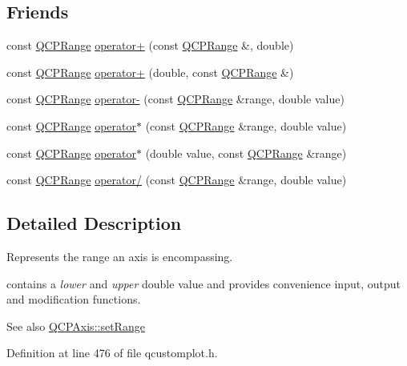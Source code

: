 \subsection*{Friends}
\begin{DoxyCompactItemize}
\item 
const \hyperlink{class_q_c_p_range}{Q\+C\+P\+Range} \hyperlink{class_q_c_p_range_af53ea6fb823a4a5897162b865841de04}{operator+} (const \hyperlink{class_q_c_p_range}{Q\+C\+P\+Range} \&, double)
\item 
const \hyperlink{class_q_c_p_range}{Q\+C\+P\+Range} \hyperlink{class_q_c_p_range_a9fb2e9941d32001482df670c0d704977}{operator+} (double, const \hyperlink{class_q_c_p_range}{Q\+C\+P\+Range} \&)
\item 
const \hyperlink{class_q_c_p_range}{Q\+C\+P\+Range} \hyperlink{class_q_c_p_range_a797f82830b516646da8873f82e39e356}{operator-\/} (const \hyperlink{class_q_c_p_range}{Q\+C\+P\+Range} \&range, double value)
\item 
const \hyperlink{class_q_c_p_range}{Q\+C\+P\+Range} \hyperlink{class_q_c_p_range_a558b1248ff6a9e41fd5b2630555a8acc}{operator$\ast$} (const \hyperlink{class_q_c_p_range}{Q\+C\+P\+Range} \&range, double value)
\item 
const \hyperlink{class_q_c_p_range}{Q\+C\+P\+Range} \hyperlink{class_q_c_p_range_a5cb2332f6957021f47cc768089f4f090}{operator$\ast$} (double value, const \hyperlink{class_q_c_p_range}{Q\+C\+P\+Range} \&range)
\item 
const \hyperlink{class_q_c_p_range}{Q\+C\+P\+Range} \hyperlink{class_q_c_p_range_a4b366a3a21974c88e09b0d39d4a24a4b}{operator/} (const \hyperlink{class_q_c_p_range}{Q\+C\+P\+Range} \&range, double value)
\end{DoxyCompactItemize}


\subsection{Detailed Description}
Represents the range an axis is encompassing. 

contains a {\itshape lower} and {\itshape upper} double value and provides convenience input, output and modification functions.

\begin{DoxySeeAlso}{See also}
\hyperlink{class_q_c_p_axis_aebdfea5d44c3a0ad2b4700cd4d25b641}{Q\+C\+P\+Axis\+::set\+Range} 
\end{DoxySeeAlso}


Definition at line 476 of file qcustomplot.\+h.



